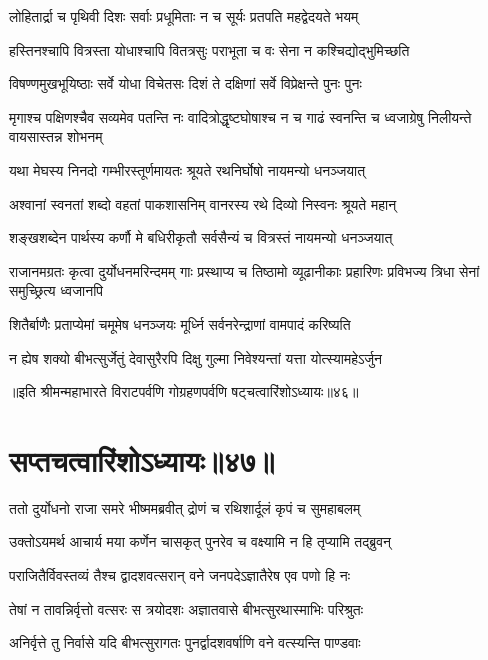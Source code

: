 \twolineshloka
{लोहितार्द्रा च पृथिवी दिशः सर्वाः प्रधूमिताः}
{न च सूर्यः प्रतपति महद्वेदयते भयम्}


\twolineshloka
{हस्तिनश्चापि वित्रस्ता योधाश्चापि वितत्रसुः}
{पराभूता च वः सेना न कश्चिद्योद्भुमिच्छति}


\twolineshloka
{विषण्णमुखभूयिष्ठाः सर्वे योधा विचेतसः}
{दिशं ते दक्षिणां सर्वे विप्रेक्षन्ते पुनः पुनः}


\threelineshloka
{मृगाश्च पक्षिणश्चैव सव्यमेव पतन्ति नः}
{वादित्रोद्धृष्टघोषाश्च न च गाढं स्वनन्ति च}
{ध्वजाग्रेषु निलीयन्ते वायसास्तन्न शोभनम्}


\twolineshloka
{यथा मेघस्य निनदो गम्भीरस्तूर्णमायतः}
{श्रूयते रथनिर्घोषो नायमन्यो धनञ्जयात्}


\twolineshloka
{अश्वानां स्वनतां शब्दो वहतां पाकशासनिम्}
{वानरस्य रथे दिव्यो निस्वनः श्रूयते महान्}


\twolineshloka
{शङ्खशब्देन पार्थस्य कर्णौ मे बधिरीकृतौ}
{सर्वसैन्यं च वित्रस्तं नायमन्यो धनञ्जयात्}


\threelineshloka
{राजानमग्रतः कृत्वा दुर्योधनमरिन्दमम्}
{गाः प्रस्थाप्य च तिष्ठामो व्यूढानीकाः प्रहारिणः}
{प्रविभज्य त्रिधा सेनां समुच्छ्रित्य ध्वजानपि}


\twolineshloka
{शितैर्बाणैः प्रताप्येमां चमूमेष धनञ्जयः}
{मूर्ध्नि सर्वनरेन्द्राणां वामपादं करिष्यति}


\twolineshloka
{न ह्येष शक्यो बीभत्सुर्जेतुं देवासुरैरपि}
{दिक्षु गुल्मा निवेश्यन्तां यत्ता योत्स्यामहेऽर्जुन}

॥इति श्रीमन्महाभारते विराटपर्वणि गोग्रहणपर्वणि षट्चत्वारिंशोऽध्यायः॥४६॥

\chapter{सप्तचत्वारिंशोऽध्यायः॥४७॥}

\twolineshloka
{ततो दुर्योधनो राजा समरे भीष्ममब्रवीत्}
{द्रोणं च रथिशार्दूलं कृपं च सुमहाबलम्}


\twolineshloka
{उक्तोऽयमर्थ आचार्य मया कर्णेन चासकृत्}
{पुनरेव च वक्ष्यामि न हि तृप्यामि तद्ब्रुवन्}


\twolineshloka
{पराजितैर्विवस्तव्यं तैश्च द्वादशवत्सरान्}
{वने जनपदेऽज्ञातैरेष एव पणो हि नः}


\twolineshloka
{तेषां न तावन्निर्वृत्तो वत्सरः स त्रयोदशः}
{अज्ञातवासे बीभत्सुरथास्माभिः परिश्रुतः}


\twolineshloka
{अनिर्वृत्ते तु निर्वासे यदि बीभत्सुरागतः}
{पुनर्द्वादशवर्षाणि वने वत्स्यन्ति पाण्डवाः}


